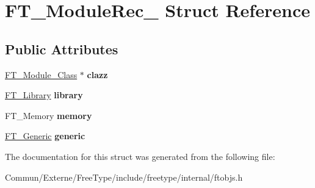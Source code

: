 \hypertarget{struct_f_t___module_rec__}{}\section{F\+T\+\_\+\+Module\+Rec\+\_\+ Struct Reference}
\label{struct_f_t___module_rec__}
\subsection*{Public Attributes}
\begin{DoxyCompactItemize}
\item 
\hyperlink{struct_f_t___module___class__}{F\+T\+\_\+\+Module\+\_\+\+Class} $\ast$ {\bfseries clazz}\hypertarget{struct_f_t___module_rec___ac762573dc13af2d2af190a9e855742f5}{}\label{struct_f_t___module_rec___ac762573dc13af2d2af190a9e855742f5}

\item 
\hyperlink{struct_f_t___library_rec__}{F\+T\+\_\+\+Library} {\bfseries library}\hypertarget{struct_f_t___module_rec___ac3d04fbdc2988bf9a39f4ad6d3cb4b5f}{}\label{struct_f_t___module_rec___ac3d04fbdc2988bf9a39f4ad6d3cb4b5f}

\item 
F\+T\+\_\+\+Memory {\bfseries memory}\hypertarget{struct_f_t___module_rec___a33113e9eb2d6cd8ee6666da75ff8e108}{}\label{struct_f_t___module_rec___a33113e9eb2d6cd8ee6666da75ff8e108}

\item 
\hyperlink{struct_f_t___generic__}{F\+T\+\_\+\+Generic} {\bfseries generic}\hypertarget{struct_f_t___module_rec___a860be13b9f239c42cacdbc5d6f81d44a}{}\label{struct_f_t___module_rec___a860be13b9f239c42cacdbc5d6f81d44a}

\end{DoxyCompactItemize}


The documentation for this struct was generated from the following file\+:\begin{DoxyCompactItemize}
\item 
Commun/\+Externe/\+Free\+Type/include/freetype/internal/ftobjs.\+h\end{DoxyCompactItemize}
